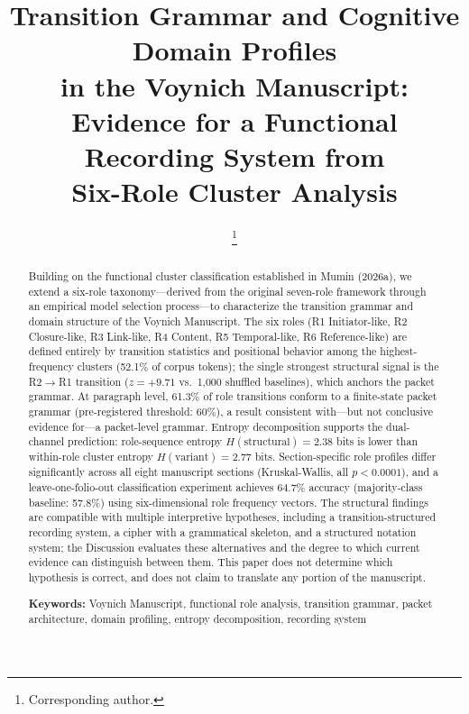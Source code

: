 \documentclass[11pt,a4paper,twocolumn]{article}
\title{\textbf{Transition Grammar and Cognitive Domain Profiles\\in the Voynich Manuscript:}\\[4pt]
\large Evidence for a Functional Recording System from\\
Six-Role Cluster Analysis}
\author[1]{\AuthorName\thanks{Corresponding author. \AuthorURL}}
\affil[1]{\AuthorRole}
\date{\PaperSubtitle}
\begin{document}
\maketitle

\begin{abstract}
\noindent Building on the functional cluster classification established in Mumin (2026a), we extend a six-role taxonomy---derived from the original seven-role framework through an empirical model selection process---to characterize the transition grammar and domain structure of the Voynich Manuscript. The six roles (R1 Initiator-like, R2 Closure-like, R3 Link-like, R4 Content, R5 Temporal-like, R6 Reference-like) are defined entirely by transition statistics and positional behavior among the highest-frequency clusters (52.1\% of corpus tokens); the single strongest structural signal is the R2$\to$R1 transition ($z = +9.71$ vs.\ 1,000 shuffled baselines), which anchors the packet grammar. %
At paragraph level, 61.3\% of role transitions conform to a finite-state packet grammar (pre-registered threshold: 60\%), a result consistent with---but not conclusive evidence for---a packet-level grammar. Entropy decomposition supports the dual-channel prediction: role-sequence entropy $H(\text{structural}) = 2.38$ bits is lower than within-role cluster entropy $H(\text{variant}) = 2.77$ bits. Section-specific role profiles differ significantly across all eight manuscript sections (Kruskal-Wallis, all $p < 0.0001$), and a leave-one-folio-out classification experiment achieves 64.7\% accuracy (majority-class baseline: 57.8\%) using six-dimensional role frequency vectors. The structural findings are compatible with multiple interpretive hypotheses, including a transition-structured recording system, a cipher with a grammatical skeleton, and a structured notation system; the Discussion evaluates these alternatives and the degree to which current evidence can distinguish between them. This paper does not determine which hypothesis is correct, and does not claim to translate any portion of the manuscript.

\medskip
\noindent\textbf{Keywords:} Voynich Manuscript, functional role analysis, transition grammar, packet architecture, domain profiling, entropy decomposition, recording system
\end{abstract}

\end{document}
